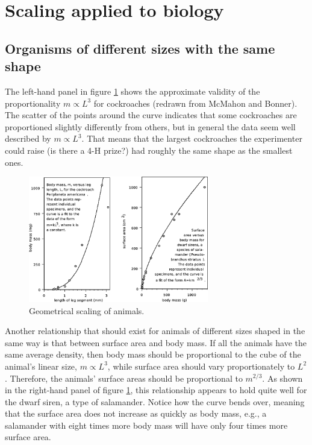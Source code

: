 \section{Scaling applied to biology}

\subsection{Organisms of different sizes with the same shape}


The left-hand panel in figure \ref{scaling-animals-1} 
shows the approximate
validity of the proportionality $m\propto L^3$ for cockroaches
(redrawn from McMahon and Bonner). The scatter of the
points around the curve indicates that some cockroaches are
proportioned slightly differently from others, but in
general the data seem well described by $m\propto L^3$. That
means that the largest cockroaches the experimenter could
raise (is there a 4-H prize?) had roughly the same shape
as the smallest ones.

\begin{figure}
\begin{center}
\includegraphics[width=0.7\textwidth]{./scaling/figs/scaling-animals-1}
\caption{ \qquad Geometrical scaling of animals.}
\label{scaling-animals-1}
\end{center}
\end{figure}


Another relationship that should exist for animals of
different sizes shaped in the same way is that between
surface area and body mass. If all the animals have the same
average density, then body mass should be proportional to
the cube of the animal's linear size, $m\propto L^3$, while
surface area should vary proportionately to $L^2$.
Therefore, the animals' surface areas should be proportional
to $m^{2/3}$. As shown in the right-hand panel of figure
\ref{scaling-animals-1}, this relationship
appears to hold quite well for the dwarf siren, a type of
salamander. Notice how the curve bends
over, meaning that the surface area does not increase as
quickly as body mass, e.g., a salamander with eight times
more body mass will have only four times more surface area.

